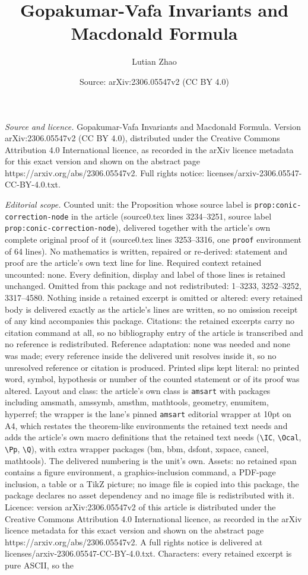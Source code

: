 \documentclass[10pt,a4paper]{amsart}
\title[Gopakumar-Vafa Invariants and Macdonald Formula]{Gopakumar-Vafa Invariants and Macdonald Formula}
\author{Lutian Zhao}
\date{Source: arXiv:2306.05547v2 (CC BY 4.0)}
\begin{document}
\maketitle

\noindent\emph{Source and licence.} Gopakumar-Vafa Invariants and Macdonald Formula. Version arXiv:2306.05547v2 (CC BY 4.0), distributed under the Creative Commons Attribution 4.0 International licence, as recorded in the arXiv licence metadata for this exact version and shown on the abstract page https://arxiv.org/abs/2306.05547v2. Full rights notice: licenses/arxiv-2306.05547-CC-BY-4.0.txt.\par\smallskip

\noindent\textit{Editorial scope.} Counted unit: the Proposition whose source label is \texttt{prop:conic-correction-node} in the article (source0.tex lines 3234--3251, source label \texttt{prop:conic-correction-node}), delivered together with the article's own complete original proof of it (source0.tex lines 3253--3316, one \texttt{proof} environment of 64 lines). No mathematics is written, repaired or re-derived: statement and proof are the article's own text line for line. Required context retained uncounted: none. Every definition, display and label of those lines is retained unchanged. Omitted from this package and not redistributed: 1--3233, 3252--3252, 3317--4580. Nothing inside a retained excerpt is omitted or altered: every retained body is delivered exactly as the article's lines are written, so no omission receipt of any kind accompanies this package. Citations: the retained excerpts carry no citation command at all, so no bibliography entry of the article is transcribed and no reference is redistributed. Reference adaptation: none was needed and none was made; every reference inside the delivered unit resolves inside it, so no unresolved reference or citation is produced. Printed slips kept literal: no printed word, symbol, hypothesis or number of the counted statement or of its proof was altered. Layout and class: the article's own class is \texttt{amsart} with packages including amsmath, amssymb, amsthm, mathtools, geometry, enumitem, hyperref; the wrapper is the lane's pinned \texttt{amsart} editorial wrapper at 10pt on A4, which restates the theorem-like environments the retained text needs and adds the article's own macro definitions that the retained text needs (\texttt{\textbackslash IC}, \texttt{\textbackslash Ocal}, \texttt{\textbackslash Pp}, \texttt{\textbackslash Q}), with extra wrapper packages (bm, bbm, dsfont, xspace, cancel, mathtools). The delivered numbering is the unit's own. Assets: no retained span contains a figure environment, a graphics-inclusion command, a PDF-page inclusion, a table or a TikZ picture; no image file is copied into this package, the package declares no asset dependency and no image file is redistributed with it. Licence: version arXiv:2306.05547v2 of this article is distributed under the Creative Commons Attribution 4.0 International licence, as recorded in the arXiv licence metadata for this exact version and shown on the abstract page https://arxiv.org/abs/2306.05547v2. A full rights notice is delivered at licenses/arxiv-2306.05547-CC-BY-4.0.txt. Characters: every retained excerpt is pure ASCII, so the 
\end{document}
